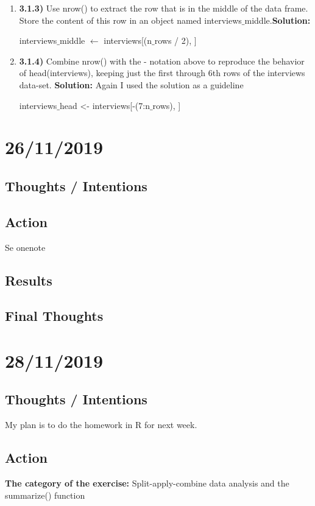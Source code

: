 \documentclass{article}
\begin{document}
\begin{enumerate}
\begin{enumerate}
    \item \textbf{3.1.3)} Use nrow() to extract the row that is in the middle of the data frame. Store the content of this row in an object named interviews$\_$middle.\textbf{Solution:}
\begin{center}
 interviews$\_$middle $\leftarrow$ interviews[(n$\_$rows / 2), ]   
\end{center}
    \item \textbf{3.1.4) }Combine nrow() with the - notation above to reproduce the behavior of head(interviews), keeping just the first through 6th rows of the interviews data-set. \textbf{Solution:} Again I used the solution as a guideline
\begin{center}
    interviews$\_$head <- interviews[-(7:n$\_$rows), ]
\end{center}
    \end{enumerate}
\end{enumerate}

\newpage
\section{26/11/2019}
\subsection{Thoughts / Intentions}
\subsection{Action}
Se onenote
\subsection{Results}
\subsection{Final Thoughts}

\newpage
\section{28/11/2019}
\subsection{Thoughts / Intentions}
My plan is to do the homework in R for next week.

\subsection{Action}
\textbf{The category of the exercise:} Split-apply-combine data analysis and the summarize() function
\end{document}
